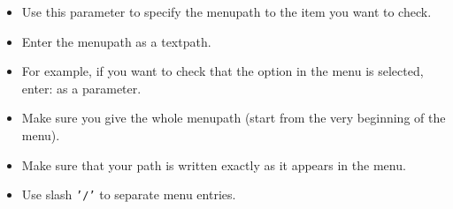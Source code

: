 \begin{itemize}
\item Use this parameter to specify the menupath to the item you want to check.
\item Enter the menupath as a textpath.
\item For example, if you want to check that the option  in the menu  is selected, enter:   as a parameter.
\item Make sure you give the whole menupath (start from the very beginning of the menu).
\item Make sure that your path is written exactly as it appears in the menu. 
\item Use slash {\tt '/'} to separate menu entries.
\end{itemize}

    
